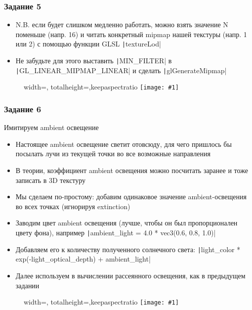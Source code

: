 \documentclass[10pt]{beamer}
\newcommand{\slideimage}[1]{
  \begin{figure}
    \begin{adjustbox}{width=\textwidth, totalheight=\textheight-2\baselineskip-2\baselineskip,keepaspectratio}
      \texttt{[image: \#1]}
    \end{adjustbox}
  \end{figure}
}
\begin{document}
\begin{frame}[fragile]
\frametitle{Задание 5}
\begin{itemize}
\item N.B. если будет слишком медленно работать, можно взять значение N поменьше (напр. 16) и читать конкретный mipmap нашей текстуры (напр. 1 или 2) с помощью функции GLSL \texttt|textureLod|
\item Не забудьте для этого выставить \texttt|MIN_FILTER| в \texttt|GL_LINEAR_MIPMAP_LINEAR| и сделать \texttt|glGenerateMipmap|
\end{itemize}
\end{frame}

\begin{frame}[fragile]
\slideimage{5.png}
\end{frame}

\begin{frame}[fragile]
\frametitle{Задание 6}
Имитируем ambient освещение
\begin{itemize}
\item Настоящее ambient освещение светит отовсюду, для чего пришлось бы посылать лучи из текущей точки во все возможные направления
\item В теории, коэффициент ambient освещения можно посчитать заранее и тоже записать в 3D текстуру
\item Мы сделаем по-простому: добавим одинаковое значение ambient-освещения во всех точках (игнорируя extinction)
\item Заводим цвет ambient освещения (лучше, чтобы он был пропорционален цвету фона), например \texttt|ambient_light = 4.0 * vec3(0.6, 0.8, 1.0)|
\item Добавляем его к количеству полученного солнечного света: \texttt|light_color * exp(-light_optical_depth) + ambient_light|
\item Далее используем в вычислении рассеянного освещения, как в предыдущем задании
\end{itemize}
\end{frame}

\begin{frame}[fragile]
\slideimage{6.png}
\end{frame}
\end{document}
